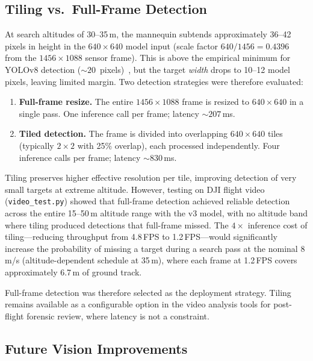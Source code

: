 \subsection{Tiling vs.\ Full-Frame Detection}\label{sec:model_comparison:tiling}

At search altitudes of 30--35\,m, the mannequin subtends approximately 36--42 pixels in height in the $640\!\times\!640$ model input (scale factor $640/1456 = 0.4396$ from the $1456\!\times\!1088$ sensor frame).  This is above the empirical minimum for YOLOv8 detection (${\sim}20$~pixels)~\cite{yolov8}, but the target \emph{width} drops to 10--12 model pixels, leaving limited margin.  Two detection strategies were therefore evaluated:

\begin{enumerate}
    \item \textbf{Full-frame resize.}  The entire $1456\times1088$ frame is resized to $640\times640$ in a single pass.  One inference call per frame; latency ${\sim}207$\,ms.
    \item \textbf{Tiled detection.}  The frame is divided into overlapping $640\times640$ tiles (typically $2\times2$ with 25\% overlap), each processed independently.  Four inference calls per frame; latency ${\sim}830$\,ms.
\end{enumerate}

Tiling preserves higher effective resolution per tile, improving detection of very small targets at extreme altitude.  However, testing on DJI flight video (\texttt{video\_test.py}) showed that full-frame detection achieved reliable detection across the entire 15--50\,m altitude range with the v3 model, with no altitude band where tiling produced detections that full-frame missed.  The $4\times$ inference cost of tiling---reducing throughput from 4.8\,FPS to 1.2\,FPS---would significantly increase the probability of missing a target during a search pass at the nominal 8\,m/s (altitude-dependent schedule at 35\,m), where each frame at 1.2\,FPS covers approximately 6.7\,m of ground track.

Full-frame detection was therefore selected as the deployment strategy.  Tiling remains available as a configurable option in the video analysis tools for post-flight forensic review, where latency is not a constraint.

\subsection{Future Vision Improvements}\label{sec:model_comparison:future}

